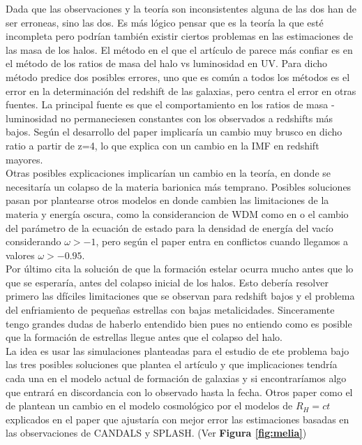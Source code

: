 Dada que las observaciones y la teoría son inconsistentes alguna de las dos han de ser erroneas, sino las dos. Es más lógico pensar que es la teoría la que esté incompleta pero podrían también existir ciertos problemas en las estimaciones de las masa de los halos. El método en el que el artículo de \cite{steinhardt2016impossibly} parece más confiar es en el método de los ratios de masa del halo vs luminosidad en UV. Para dicho método predice dos posibles errores, uno que es común a todos los métodos es el error en la determinación del redshift de las galaxias, pero centra el error en otras fuentes. La principal fuente es que el comportamiento en los ratios de masa - luminosidad no permaneciesen constantes con los observados a redshifts más bajos. Según el desarrollo del paper implicaría un cambio muy brusco en dicho ratio a partir de z=4, lo que explica con un cambio en la IMF en redshift mayores. \\

Otras posibles explicaciones implicarían un cambio en la teoría, en donde se necesitaría un colapso de la materia barionica más temprano. Posibles soluciones pasan por plantearse otros modelos en donde cambien las limitaciones de la materia y energía oscura, como la considerancion de WDM como en \cite{gao2007gao} o el cambio del parámetro de la ecuación de estado para la densidad de energía del vacío considerando $\omega>-1$, pero según el paper entra en conflictos cuando llegamos a valores $\omega >-0.95$.\\

Por último cita la solución de que la formación estelar ocurra mucho antes que lo que se esperaría, antes del colapso inicial de los halos. Esto debería resolver primero las dfíciles limitaciones que se observan para redshift bajos y el problema del enfriamiento de pequeñas estrellas con bajas metalicidades. Sinceramente tengo grandes dudas de haberlo entendido bien pues no entiendo como es posible que la formación de estrellas llegue antes que el colapso del halo.\\

La idea es usar las simulaciones planteadas para el estudio de ete problema bajo las tres posibles soluciones que plantea el artículo y que implicaciones tendría cada una en el modelo actual de formación de galaxias y si encontraríamos algo que entrará en discordancia con lo observado hasta la fecha. Otros paper como el de \cite{yennapureddy2018cosmological} plantean un cambio en el modelo cosmológico por el modelos de $R_H=ct$ explicados en el paper \cite{10.1111/j.1365-2966.2011.19906.x} que ajustaría con mejor error las estimaciones basadas en las observaciones de CANDALS y SPLASH. (Ver \textbf{Figura \ref{fig:melia}})

